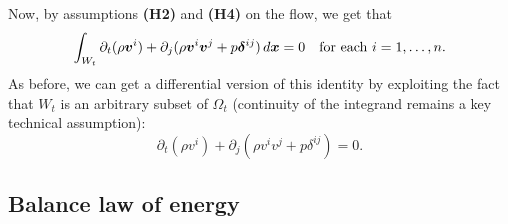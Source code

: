 Now, by assumptions \textbf{(H2)} and \textbf{(H4)} on the flow,
we get that
\[
\int_{W_t} \partial_t (\rho \bm{v}^i)
	+ \partial_j (\rho \bm{v}^i \bm{v}^j + p \bm{\delta}^{ij}) \, d\bm{x}
	= 0 \quad \text{for each $i = 1,\dots,n$}.
\]
As before, we can get a differential version of this identity
by exploiting the fact that $W_t$ is an arbitrary subset of $\Omega_t$
(continuity of the integrand remains a key technical assumption):
\begin{equation} \label{eq:bilancio-quantita-di-moto}
\partial_t (\rho v^i) + \partial_j (\rho v^i v^j + p\delta^{ij}) = 0.
\end{equation}

\subsection*{Balance law of energy}

